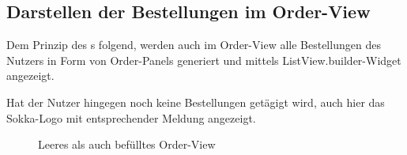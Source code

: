 \newpage

\subsection{Darstellen der Bestellungen im Order-View}

Dem Prinzip des s folgend, werden auch im Order-View alle Bestellungen des Nutzers
in Form von Order-Panels generiert und mittels ListView.builder-Widget angezeigt.

Hat der Nutzer hingegen noch keine Bestellungen getägigt wird, auch hier das Sokka-Logo mit entsprechender
Meldung angezeigt.

\begin{figure}[H]
    \centering
    \hfill
    \hfill
    \hfill
    \caption{Leeres als auch befülltes Order-View}
\end{figure}